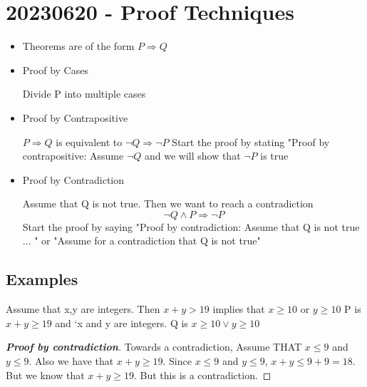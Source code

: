 \documentclass{report}
\begin{document}
\section*{20230620 - Proof Techniques}%
  \begin{itemize}
    \item Theorems are of the form $P \Longrightarrow Q$
    \item Proof by Cases

      Divide P into multiple cases

    \item Proof by Contrapositive

      $P \Longrightarrow Q $ is equivalent to $\neg Q \Longrightarrow \neg P$
      Start the proof by stating "Proof by contrapositive: Assume $\neg Q$
      and we will show that $\neg P$ is true

    \item Proof by Contradiction

      Assume that Q is not true.  Then we want to reach a contradiction
        \[ \neg Q \wedge P \Longrightarrow \neg P \]
      Start the proof by saying "Proof by contradiction:  Assume that
      Q is not true ... "  or "Assume for a contradiction that Q is not
      true"
  \end{itemize}

  \subsection*{Examples}%
  \ex{} {
     {
      Assume that x,y are integers.  Then $x+y > 19$ implies that
          $x \geq 10$ or $y \geq 10$
    }
    P is $x + y \geq 19$ and `x and y are integers.  Q is $x \geq 10 \vee
    y \geq 10$


      \renewcommand\qedsymbol{\Lightning}
      \begin{proof}[\textbf{Proof by contradiction}]  Towards a contradiction,
        Assume THAT $ x \leq 9$ and $y \leq 9$.  Also we have that
        $x + y \geq 19$.  Since $x \leq 9$ and $y \leq 9$,
        $x + y \leq 9 + 9 = 18$.  But we know that $x + y \geq 19$.  But
        this is a contradiction.
      \end{proof}
      \renewcommand\qedsymbol{$\square$}
  }
\end{document}
